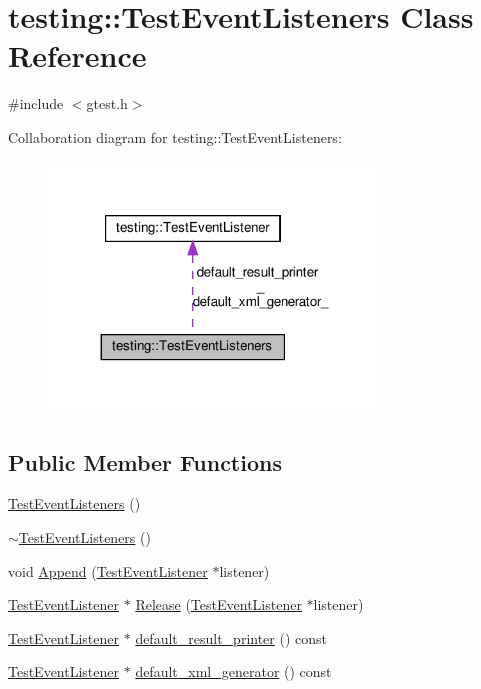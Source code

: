 \hypertarget{classtesting_1_1TestEventListeners}{}\section{testing\+:\+:Test\+Event\+Listeners Class Reference}
\label{classtesting_1_1TestEventListeners}


{\ttfamily \#include $<$gtest.\+h$>$}



Collaboration diagram for testing\+:\+:Test\+Event\+Listeners\+:\nopagebreak
\begin{figure}[H]
\begin{center}
\leavevmode
\includegraphics[width=251pt]{classtesting_1_1TestEventListeners__coll__graph}
\end{center}
\end{figure}
\subsection*{Public Member Functions}
\begin{DoxyCompactItemize}
\item 
\hyperlink{classtesting_1_1TestEventListeners_af0716e4067a6f357ee5ea18802a591dd}{Test\+Event\+Listeners} ()
\item 
\hyperlink{classtesting_1_1TestEventListeners_abe9fbbbedf7f55fa898abfae60aa4913}{$\sim$\+Test\+Event\+Listeners} ()
\item 
void \hyperlink{classtesting_1_1TestEventListeners_a1207dce74d64c1c39ffa6105560536a0}{Append} (\hyperlink{classtesting_1_1TestEventListener}{Test\+Event\+Listener} $\ast$listener)
\item 
\hyperlink{classtesting_1_1TestEventListener}{Test\+Event\+Listener} $\ast$ \hyperlink{classtesting_1_1TestEventListeners_a5d4bfb7d8584801d6074bb0ec28f8bda}{Release} (\hyperlink{classtesting_1_1TestEventListener}{Test\+Event\+Listener} $\ast$listener)
\item 
\hyperlink{classtesting_1_1TestEventListener}{Test\+Event\+Listener} $\ast$ \hyperlink{classtesting_1_1TestEventListeners_a6293443acb5af942eeec638b6aa6dcf2}{default\+\_\+result\+\_\+printer} () const
\item 
\hyperlink{classtesting_1_1TestEventListener}{Test\+Event\+Listener} $\ast$ \hyperlink{classtesting_1_1TestEventListeners_aa880de6ddfc3f5824371853c6846abbd}{default\+\_\+xml\+\_\+generator} () const
\end{DoxyCompactItemize}
